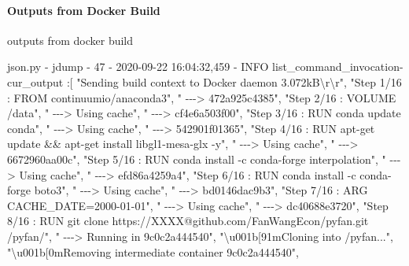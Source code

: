 \documentclass[
]{book}
\newenvironment{Shaded}{\begin{snugshade}}{\end{snugshade}}
\newcommand{\ExtensionTok}[1]{#1}
\newcommand{\NormalTok}[1]{#1}
\newcommand{\StringTok}[1]{\textcolor[rgb]{0.31,0.60,0.02}{#1}}
\begin{document}
\hypertarget{outputs-from-docker-build}{%
\paragraph{Outputs from Docker Build}\label{outputs-from-docker-build}}

outputs from docker build

\begin{Shaded}
\begin{Highlighting}[]
\ExtensionTok{json.py}\NormalTok{ {-} jdump {-} 47 {-}  2020{-}09{-}22 16:04:32,459 {-} INFO list\_command\_invocation{-}cur\_output}
\NormalTok{:[}
    \StringTok{"Sending build context to Docker daemon  3.072kB\textbackslash{}r\textbackslash{}r"}\NormalTok{,}
    \StringTok{"Step 1/16 : FROM continuumio/anaconda3"}\NormalTok{,}
    \StringTok{" {-}{-}{-}\textgreater{} 472a925c4385"}\NormalTok{,}
    \StringTok{"Step 2/16 : VOLUME /data"}\NormalTok{,}
    \StringTok{" {-}{-}{-}\textgreater{} Using cache"}\NormalTok{,}
    \StringTok{" {-}{-}{-}\textgreater{} cf4e6a503f00"}\NormalTok{,}
    \StringTok{"Step 3/16 : RUN conda update conda"}\NormalTok{,}
    \StringTok{" {-}{-}{-}\textgreater{} Using cache"}\NormalTok{,}
    \StringTok{" {-}{-}{-}\textgreater{} 542901f01365"}\NormalTok{,}
    \StringTok{"Step 4/16 : RUN apt{-}get update \&\& apt{-}get install libgl1{-}mesa{-}glx {-}y"}\NormalTok{,}
    \StringTok{" {-}{-}{-}\textgreater{} Using cache"}\NormalTok{,}
    \StringTok{" {-}{-}{-}\textgreater{} 6672960aa00c"}\NormalTok{,}
    \StringTok{"Step 5/16 : RUN conda install {-}c conda{-}forge interpolation"}\NormalTok{,}
    \StringTok{" {-}{-}{-}\textgreater{} Using cache"}\NormalTok{,}
    \StringTok{" {-}{-}{-}\textgreater{} efd86a4259a4"}\NormalTok{,}
    \StringTok{"Step 6/16 : RUN conda install {-}c conda{-}forge boto3"}\NormalTok{,}
    \StringTok{" {-}{-}{-}\textgreater{} Using cache"}\NormalTok{,}
    \StringTok{" {-}{-}{-}\textgreater{} bd0146dac9b3"}\NormalTok{,}
    \StringTok{"Step 7/16 : ARG CACHE\_DATE=2000{-}01{-}01"}\NormalTok{,}
    \StringTok{" {-}{-}{-}\textgreater{} Using cache"}\NormalTok{,}
    \StringTok{" {-}{-}{-}\textgreater{} dc40688e3720"}\NormalTok{,}
    \StringTok{"Step 8/16 : RUN git clone https://XXXX@github.com/FanWangEcon/pyfan.git /pyfan/"}\NormalTok{,}
    \StringTok{" {-}{-}{-}\textgreater{} Running in 9c0c2a444540"}\NormalTok{,}
    \StringTok{"\textbackslash{}u001b[91mCloning into \textquotesingle{}/pyfan\textquotesingle{}..."}\NormalTok{,}
    \StringTok{"\textbackslash{}u001b[0mRemoving intermediate container 9c0c2a444540"}\NormalTok{,}

\end{Highlighting}
\end{Shaded}
\end{document}
